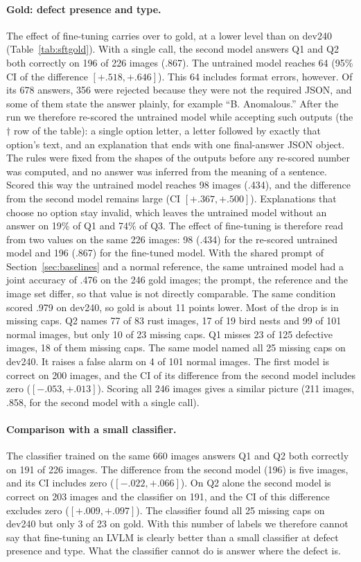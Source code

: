 \documentclass[11pt]{article}
\begin{document}
\paragraph{Gold: defect presence and type.} The effect of fine-tuning carries over to gold, at a lower level than on dev240 (Table~\ref{tab:sftgold}). With a single call, the second model answers Q1 and Q2 both correctly on 196 of 226 images (.867). The untrained model reaches 64 (95\% CI of the difference $[+.518,+.646]$). This 64 includes format errors, however. Of its 678 answers, 356 were rejected because they were not the required JSON, and some of them state the answer plainly, for example ``B. Anomalous.'' After the run we therefore re-scored the untrained model while accepting such outputs (the $\dagger$ row of the table): a single option letter, a letter followed by exactly that option's text, and an explanation that ends with one final-answer JSON object. The rules were fixed from the shapes of the outputs before any re-scored number was computed, and no answer was inferred from the meaning of a sentence. Scored this way the untrained model reaches 98 images (.434), and the difference from the second model remains large (CI $[+.367,+.500]$). Explanations that choose no option stay invalid, which leaves the untrained model without an answer on 19\% of Q1 and 74\% of Q3. The effect of fine-tuning is therefore read from two values on the same 226 images: 98 (.434) for the re-scored untrained model and 196 (.867) for the fine-tuned model. With the shared prompt of Section~\ref{sec:baselines} and a normal reference, the same untrained model had a joint accuracy of .476 on the 246 gold images; the prompt, the reference and the image set differ, so that value is not directly comparable. The same condition scored .979 on dev240, so gold is about 11 points lower. Most of the drop is in missing caps. Q2 names 77 of 83 rust images, 17 of 19 bird nests and 99 of 101 normal images, but only 10 of 23 missing caps. Q1 misses 23 of 125 defective images, 18 of them missing caps. The same model named all 25 missing caps on dev240. It raises a false alarm on 4 of 101 normal images. The first model is correct on 200 images, and the CI of its difference from the second model includes zero ($[-.053,+.013]$). Scoring all 246 images gives a similar picture (211 images, .858, for the second model with a single call).

\paragraph{Comparison with a small classifier.} The classifier trained on the same 660 images answers Q1 and Q2 both correctly on 191 of 226 images. The difference from the second model (196) is five images, and its CI includes zero ($[-.022,+.066]$). On Q2 alone the second model is correct on 203 images and the classifier on 191, and the CI of this difference excludes zero ($[+.009,+.097]$). The classifier found all 25 missing caps on dev240 but only 3 of 23 on gold. With this number of labels we therefore cannot say that fine-tuning an LVLM is clearly better than a small classifier at defect presence and type. What the classifier cannot do is answer where the defect is.
\end{document}
